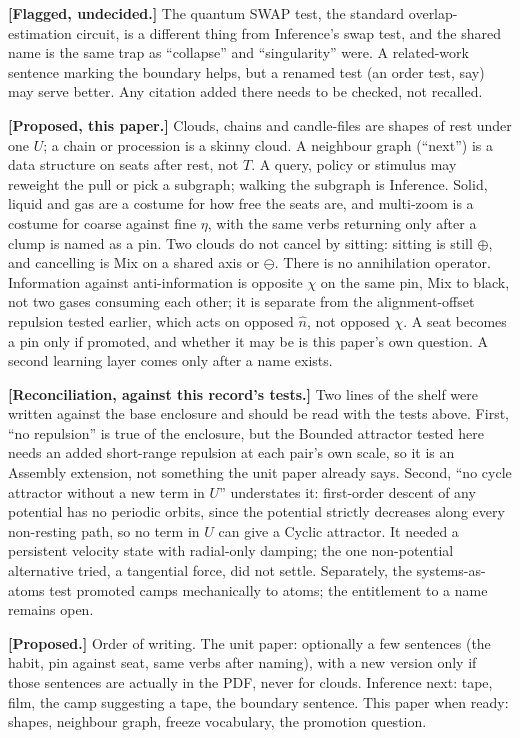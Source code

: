 \documentclass[12pt, a4paper]{article}
\begin{document}
\textbf{[Flagged, undecided.]} The quantum SWAP test, the standard
overlap-estimation circuit, is a different thing from Inference's
swap test, and the shared name is the same trap as ``collapse'' and
``singularity'' were. A related-work sentence marking the boundary
helps, but a renamed test (an order test, say) may serve better. Any
citation added there needs to be checked, not recalled.

\textbf{[Proposed, this paper.]} Clouds, chains and candle-files are
shapes of rest under one $U$; a chain or procession is a skinny
cloud. A neighbour graph (``next'') is a data structure on seats
after rest, not $T$. A query, policy or stimulus may reweight the
pull or pick a subgraph; walking the subgraph is Inference. Solid,
liquid and gas are a costume for how free the seats are, and
multi-zoom is a costume for coarse against fine $\eta$, with the
same verbs returning only after a clump is named as a pin. Two
clouds do not cancel by sitting: sitting is still $\oplus$, and
cancelling is Mix on a shared axis or $\ominus$. There is no
annihilation operator. Information against anti-information is
opposite $\chi$ on the same pin, Mix to black, not two gases
consuming each other; it is separate from the alignment-offset
repulsion tested earlier, which acts on opposed $\hat n$, not
opposed $\chi$. A seat becomes a pin only if promoted, and whether
it may be is this paper's own question. A second learning layer
comes only after a name exists.

\textbf{[Reconciliation, against this record's tests.]} Two lines of
the shelf were written against the base enclosure and should be read
with the tests above. First, ``no repulsion'' is true of the
enclosure, but the Bounded attractor tested here needs an added
short-range repulsion at each pair's own scale, so it is an Assembly
extension, not something the unit paper already says. Second, ``no
cycle attractor without a new term in $U$'' understates it:
first-order descent of any potential has no periodic orbits, since
the potential strictly decreases along every non-resting path, so no
term in $U$ can give a Cyclic attractor. It needed a persistent
velocity state with radial-only damping; the one non-potential
alternative tried, a tangential force, did not settle. Separately,
the systems-as-atoms test promoted camps mechanically to atoms; the
entitlement to a name remains open.

\textbf{[Proposed.]} Order of writing. The unit paper: optionally a
few sentences (the habit, pin against seat, same verbs after
naming), with a new version only if those sentences are actually in
the PDF, never for clouds. Inference next: tape, film, the camp
suggesting a tape, the boundary sentence. This paper when ready:
shapes, neighbour graph, freeze vocabulary, the promotion question.
\end{document}
